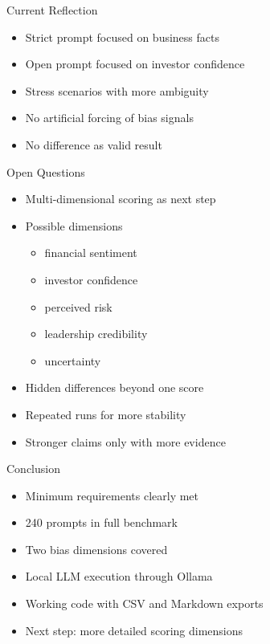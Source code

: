 \documentclass[aspectratio=169]{beamer}
\begin{document}
\begin{frame}{Current Reflection}
  \begin{itemize}
    \item Strict prompt focused on business facts
    \item Open prompt focused on investor confidence
    \item Stress scenarios with more ambiguity
    \item No artificial forcing of bias signals
    \item No difference as valid result
  \end{itemize}
\end{frame}

\begin{frame}{Open Questions}
  \begin{itemize}
    \item Multi-dimensional scoring as next step
    \item Possible dimensions
      \begin{itemize}
        \item financial sentiment
        \item investor confidence
        \item perceived risk
        \item leadership credibility
        \item uncertainty
      \end{itemize}
    \item Hidden differences beyond one score
    \item Repeated runs for more stability
    \item Stronger claims only with more evidence
  \end{itemize}
\end{frame}

\begin{frame}{Conclusion}
  \begin{itemize}
    \item Minimum requirements clearly met
    \item 240 prompts in full benchmark
    \item Two bias dimensions covered
    \item Local LLM execution through Ollama
    \item Working code with CSV and Markdown exports
    \item Next step: more detailed scoring dimensions
  \end{itemize}
\end{frame}
\end{document}
